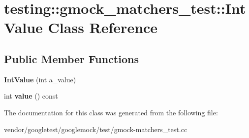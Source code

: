 \hypertarget{classtesting_1_1gmock__matchers__test_1_1_int_value}{}\section{testing\+:\+:gmock\+\_\+matchers\+\_\+test\+:\+:Int\+Value Class Reference}
\label{classtesting_1_1gmock__matchers__test_1_1_int_value}
\subsection*{Public Member Functions}
\begin{DoxyCompactItemize}
\item 
\mbox{\label{classtesting_1_1gmock__matchers__test_1_1_int_value_a2a294fcf7ad9f4d9888c4e6194fcd848}} 
{\bfseries Int\+Value} (int a\+\_\+value)
\item 
\mbox{\label{classtesting_1_1gmock__matchers__test_1_1_int_value_a6da000ea8ff787591e07ffaa3c1027d4}} 
int {\bfseries value} () const
\end{DoxyCompactItemize}


The documentation for this class was generated from the following file\+:\begin{DoxyCompactItemize}
\item 
vendor/googletest/googlemock/test/gmock-\/matchers\+\_\+test.\+cc\end{DoxyCompactItemize}

